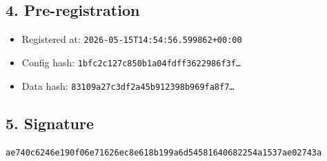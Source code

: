 \documentclass{article}
\begin{document}
\subsection*{4. Pre-registration}
\begin{itemize}
\item Registered at: \texttt{2026-05-15T14:54:56.599862+00:00}
\item Config hash: \texttt{1bfc2c127c850b1a04fdff3622986f3f\dots}
\item Data hash: \texttt{83109a27c3df2a45b912398b969fa8f7\dots}
\end{itemize}
\subsection*{5. Signature}
\texttt{ae740c6246e190f06e71626ec8e618b199a6d54581640682254a1537ae02743a}\\
\end{document}

